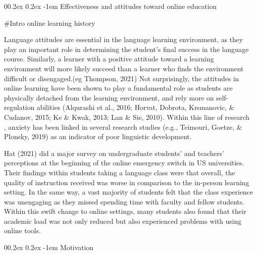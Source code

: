 \documentclass[
  man]{apa6}
\makeatletter
\let\oldparagraph\paragraph
\renewcommand{\paragraph}[1]{\oldparagraph{#1}\mbox{}}
\renewcommand{\paragraph}{\@startsection{paragraph}{4}{\parindent}%
  {0\baselineskip \@plus 0.2ex \@minus 0.2ex}%
  {-1em}%
  {\normalfont\normalsize\bfseries\itshape\typesectitle}}
\makeatother
\begin{document}
\hypertarget{effectiveness-and-attitudes-toward-online-education}{%
\paragraph{Effectiveness and attitudes toward online education}\label{effectiveness-and-attitudes-toward-online-education}}

\#Intro online learning history

Language attitudes are essential in the language learning environment, as they play an important role in determining the student's final success in the language course.
Similarly, a learner with a positive attitude toward a learning environment will more likely succeed than a learner who finds the environment difficult or disengaged.(eg Thompson, 2021)
Not surprisingly, the attitudes in online learning have been shown to play a fundamental role as students are physically detached from the learning environment, and rely more on self-regulation abilities (Alqurashi et al., 2016; Horvat, Dobrota, Krsmanovic, \& Cudanov, 2015; Ke \& Kwak, 2013; Lan \& Sie, 2010).
Within this line of research , anxiety has been linked in several research studies (e.g., Teimouri, Goetze, \& Plonsky, 2019) as an indicator of poor linguistic development.

Hat (2021) did a major survey on undergraduate students' and teachers' perceptions at the beginning of the online emergency switch in US universities.
Their findings within students taking a language class were that overall, the quality of instruction received was worse in comparison to the in-person learning setting.
In the same way, a vast majority of students felt that the class experience was unengaging as they missed spending time with faculty and fellow students.
Within this swift change to online settings, many students also found that their academic load was not only reduced but also experienced problems with using online tools.

\hypertarget{motivation}{%
\paragraph{Motivation}\label{motivation}}
\end{document}
